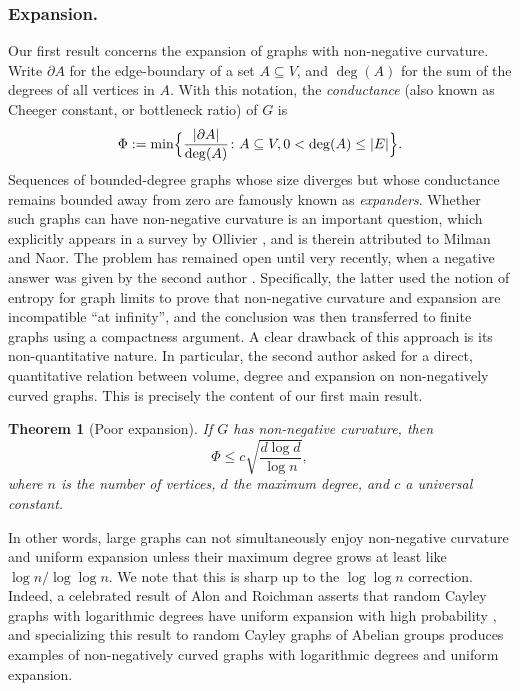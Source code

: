 \documentclass[JEP,XML,SOM,Unicode,NoEqCountersInSection,published]{cedram}
\newtheorem{theorem}{Theorem}
\theoremstyle{definition}
\begin{document}
\subsubsection*{Expansion.} Our first result concerns the expansion of graphs with non-negative curvature. Write $\partial A$ for the edge-boundary of a set $A\subseteq V$, and $\deg(A)$ for the sum of the degrees of all vertices in $A$. With this notation, the \emph{conductance} (also known as Cheeger constant, or bottleneck ratio) of $G$ is
\begin{equation*}
\Phi := \min\Bigl\{\frac{|\partial A|}{\deg(A)}\colon A\subseteq V,0<\deg(A)\le |E|\Bigr\}.
\end{equation*}
Sequences of bounded-degree graphs whose size diverges but whose conductance remains bounded away from zero are famously known as \emph{expanders}. Whether such graphs can have non-negative curvature is an important question, which explicitly appears in a survey by Ollivier \cite[Probl.\,T]{ollivier2010survey}, and is therein attributed to Milman and Naor. The problem has remained open until very recently, when a negative answer was given by the second author \cite{salez2021sparse}. Specifically, the latter used the notion of entropy for graph limits to prove that non-negative curvature and expansion are incompatible “at infinity”, and the conclusion was then transferred to finite graphs using a compactness argument. A clear drawback of this approach is its non-quantitative nature. In particular, the second author asked for a direct, quantitative relation between volume, degree and expansion on non-negatively curved graphs. This is precisely the content of our first main result.
\begin{theorem}[Poor expansion]\label{th:nonexp}If $G$ has non-negative curvature, then
\begin{equation*}
\Phi \le c\sqrt{\frac{d\log d}{\log n}},
\end{equation*}
where $n$ is the number of vertices, $d$ the maximum degree, and $c$ a universal constant.
\end{theorem}
In other words, large graphs can not simultaneously enjoy non-negative curvature and uniform expansion unless their maximum degree grows at least like $\log n/\log\log n$. We note that this is sharp up to the $\log\log n$ correction. Indeed, a celebrated result of Alon and Roichman asserts that random Cayley graphs with logarithmic degrees have uniform expansion with high probability \cite{MR1262979}, and specializing this result to random Cayley graphs of Abelian groups produces examples of non-negatively curved graphs with logarithmic degrees and uniform expansion.
\end{document}
